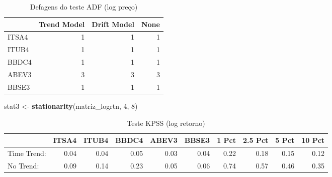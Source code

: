 \documentclass[]{article}
\newenvironment{Shaded}{\begin{snugshade}}{\end{snugshade}}
\newcommand{\KeywordTok}[1]{\textcolor[rgb]{0.13,0.29,0.53}{\textbf{{#1}}}}
\newcommand{\DataTypeTok}[1]{\textcolor[rgb]{0.13,0.29,0.53}{{#1}}}
\newcommand{\DecValTok}[1]{\textcolor[rgb]{0.00,0.00,0.81}{{#1}}}
\newcommand{\StringTok}[1]{\textcolor[rgb]{0.31,0.60,0.02}{{#1}}}
\newcommand{\OtherTok}[1]{\textcolor[rgb]{0.56,0.35,0.01}{{#1}}}
\newcommand{\NormalTok}[1]{{#1}}
\begin{document}
\begin{longtable}[t]{lrrr}
\caption{\label{tab:unnamed-chunk-11}Defagens do teste ADF (log preço)}\\
\toprule
  & Trend Model & Drift Model & None\\
\midrule
ITSA4 & 1 & 1 & 1\\
ITUB4 & 1 & 1 & 1\\
BBDC4 & 1 & 1 & 1\\
ABEV3 & 3 & 3 & 3\\
BBSE3 & 1 & 1 & 1\\
\bottomrule
\end{longtable}

\begin{Shaded}
\begin{Highlighting}[]
\NormalTok{stat3 <-}\StringTok{ }\KeywordTok{stationarity}\NormalTok{(matriz_logrtn, }\DecValTok{4}\NormalTok{, }\DecValTok{8}\NormalTok{)}
\end{Highlighting}
\end{Shaded}

\begin{Shaded}
\end{Shaded}

\begin{longtable}[t]{lrrrrrrrrr}
\caption{\label{tab:unnamed-chunk-12}Teste KPSS (log retorno)}\\
\toprule
  & ITSA4 & ITUB4 & BBDC4 & ABEV3 & BBSE3 & 1 Pct & 2.5 Pct & 5 Pct & 10 Pct\\
\midrule
Time Trend: & 0.04 & 0.04 & 0.05 & 0.03 & 0.04 & 0.22 & 0.18 & 0.15 & 0.12\\
No Trend: & 0.09 & 0.14 & 0.23 & 0.05 & 0.06 & 0.74 & 0.57 & 0.46 & 0.35\\
\bottomrule
\end{longtable}

\begin{Shaded}
\end{Shaded}
\end{document}
